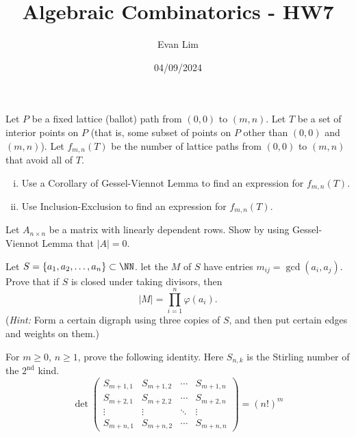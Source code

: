 \documentclass[11pt,letterpaper]{article}
\title{Algebraic Combinatorics - HW7}
\author{Evan Lim}
\date{04/09/2024}
\begin{document}
\maketitle
\begin{quest}[\textcolor{red}{Lattice Paths avoiding a certain set of points}]
Let $P$ be a fixed lattice (ballot) path from $(0,0)$ to $(m,n)$. Let $T$ be a set of interior points on $P$ (that is, some subset of points on $P$ other than $(0,0)$ and $(m,n)$). Let $f_{m,n}(T)$ be the number of lattice paths from $(0,0)$ to $(m,n)$ that avoid all of $T$.
\begin{enumerate}[(i)]
    \item Use a Corollary of Gessel-Viennot Lemma to find an expression for $f_{m,n}(T)$.
    \item Use Inclusion-Exclusion to find an expression for $f_{m,n}(T)$.
\end{enumerate}
\end{quest}
\begin{quest}[\textcolor{red}{Linear dependency and Gessel-Vienot}]
    Let $A_{n\times n}$ be a matrix with linearly dependent rows. Show by using Gessel-Viennot Lemma that $|A|=0$.
\end{quest}
\begin{quest}[\textcolor{red}{GCD matrix}]
    Let $S=\{a_1,a_2,\dots,a_n\}\subset\NN$. let the  $M$ of $S$ have entries $m_{ij}=\gcd(a_i,a_j)$. Prove that if $S$ is closed under taking divisors, then \[|M|=\prod_{i=1}^n\varphi(a_i).\]
    (\textit{Hint:} Form a certain digraph using three copies of $S$, and then put certain edges and weights on them.)
\end{quest}
\begin{quest}[\textcolor{red}{Determinant of a marix of Stirling Numbers}]
    For $m\geq0$, $n\geq 1$, prove the following identity. Here $S_{n,k}$ is the Stirling number of the $2^{\text{nd}}$ kind.
    \[\det\begin{pmatrix}S_{m+1,1}&S_{m+1,2}&\cdots&S_{m+1,n}\\S_{m+2,1}&S_{m+2,2}&\cdots&S_{m+2,n}\\\vdots&\vdots&\ddots&\vdots\\S_{m+n,1}&S_{m+n,2}&\cdots&S_{m+n,n}\end{pmatrix}=(n!)^m\]
\end{quest}
\end{document}
